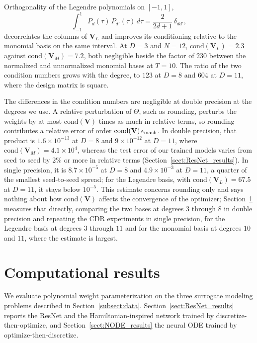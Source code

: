 \documentclass[pdflatex,sn-mathphys-num]{sn-jnl}%
\theoremstyle{thmstyleone}%
\theoremstyle{thmstyletwo}%
\theoremstyle{thmstylethree}%
\begin{document}
Orthogonality of the Legendre polynomials on $[-1,1]$,
\[
    \int_{-1}^{1} P_d(\tau)\,P_{d'}(\tau)\,d\tau = \frac{2}{2d+1}\,\delta_{dd'},
\]
decorrelates the columns of $\mathbf{V}_L$ and improves its conditioning relative to the monomial basis on the same interval.
%
At $D=3$ and $N=12$, $\mathrm{cond}(\mathbf{V}_L) = 2.3$ against $\mathrm{cond}(\mathbf{V}_M) = 7.2$, both negligible beside the factor of $230$ between the normalized and unnormalized monomial bases at $T=10$.
%
The ratio of the two condition numbers grows with the degree, to $123$ at $D=8$ and $604$ at $D=11$, where the design matrix is square.

The differences in the condition numbers are negligible at double precision at the degrees we use.
%
A relative perturbation of $\Theta$, such as rounding, perturbs the weights by at most $\mathrm{cond}(\mathbf{V})$ times as much in relative terms, so rounding contributes a relative error of order $\mathrm{cond}(\mathbf{V})\,\epsilon_{\rm mach}$.
%
In double precision, that product is $1.6\times10^{-13}$ at $D=8$ and $9\times10^{-12}$ at $D=11$, where $\mathrm{cond}(\mathbf{V}_M) = 4.1\times10^{4}$, whereas the test error of our trained models varies from seed to seed by $2\%$ or more in relative terms (Section~\ref{sect:ResNet_results}).
%
In single precision, it is $8.7\times10^{-5}$ at $D=8$ and $4.9\times10^{-3}$ at $D=11$, a quarter of the smallest seed-to-seed spread; for the Legendre basis, with $\mathrm{cond}(\mathbf{V}_L) = 67.5$ at $D=11$, it stays below $10^{-5}$.
%
This estimate concerns rounding only and says nothing about how $\mathrm{cond}(\mathbf{V})$ affects the convergence of the optimizer; Section~\ref{sect:results} measures that directly, comparing the two bases at degrees $3$ through $8$ in double precision and repeating the CDR experiments in single precision, for the Legendre basis at degrees $3$ through $11$ and for the monomial basis at degrees $10$ and $11$, where the estimate is largest.




\section{Computational results}\label{sect:results}
We evaluate polynomial weight parameterization on the three surrogate modeling problems described in Section~\ref{subsect:data}.
%
Section~\ref{sect:ResNet_results} reports the ResNet and the Hamiltonian-inspired network trained by discretize-then-optimize, and Section~\ref{sect:NODE_results} the neural ODE trained by optimize-then-discretize.
\end{document}
